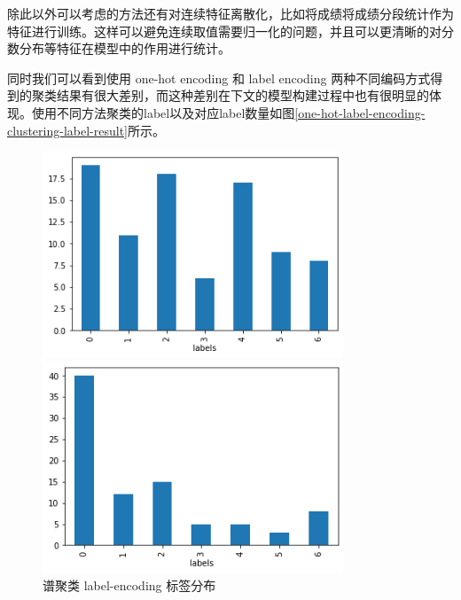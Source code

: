 除此以外可以考虑的方法还有对连续特征离散化，比如将成绩将成绩分段统计作为特征进行训练。这样可以避免连续取值需要归一化的问题，并且可以更清晰的对分数分布等特征在模型中的作用进行统计。

同时我们可以看到使用 one-hot encoding 和 label encoding 两种不同编码方式得到的聚类结果有很大差别，而这种差别在下文的模型构建过程中也有很明显的体现。使用不同方法聚类的label以及对应label数量如图\ref{one-hot-label-encoding-clustering-label-result}所示。
\begin{figure}[htb]
    \vspace{13pt} %
    \centering
    \begin{minipage}[htb]{0.4\linewidth}
        \includegraphics[width=0.8\textwidth]{images/Spectral-clustering-label-result-label-encoding.png}
        \caption{谱聚类 label-encoding 标签分布}
    \end{minipage}
    \begin{minipage}[htb]{0.4\linewidth}
        \includegraphics[width=0.8\textwidth]{images/Kmeans-label-result-label-encoding-.png}

\end{minipage}
\end{figure}
